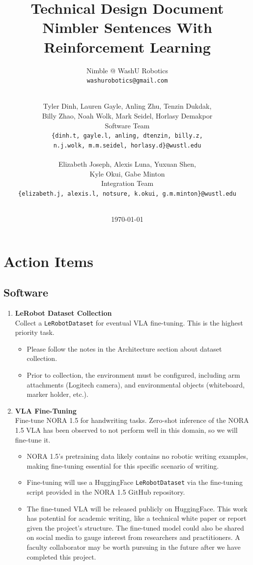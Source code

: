 \documentclass[12pt,a4paper]{article}
\title{\textbf{Technical Design Document}\\[0.5em]\large Nimbler Sentences With Reinforcement Learning}
\author{Nimble @ WashU Robotics \\ \texttt{washurobotics@gmail.com}}
\author{
    \\
    Tyler Dinh, Lauren Gayle, Anling Zhu, Tenzin Dukdak, \\
    Billy Zhao, Noah Wolk, Mark Seidel, Horlasy Demakpor \\[0.3em]
    Software Team \\[0.2em]
    \texttt{\{dinh.t, gayle.l, anling, dtenzin, billy.z,} \\
    \texttt{n.j.wolk, m.m.seidel, horlasy.d\}@wustl.edu} \\\\
    Elizabeth Joseph, Alexis Luna, Yuxuan Shen, \\
    Kyle Okui, Gabe Minton \\[0.3em]
    Integration Team \\[0.2em]
    \texttt{\{elizabeth.j, alexis.l, notsure, k.okui, g.m.minton\}@wustl.edu}\\\\
}
\date{\today}
\begin{document}
\maketitle
\newpage
\tableofcontents
\newpage

\section*{Action Items}
\subsection*{Software}

\begin{enumerate}

  \item \textbf{LeRobot Dataset Collection} \\
  Collect a \texttt{LeRobotDataset} for eventual VLA fine-tuning. This is the highest priority task.
  \begin{itemize}
    \item Please follow the notes in the Architecture section about dataset collection.
    \item Prior to collection, the environment must be configured, including arm attachments (Logitech camera), and environmental objects (whiteboard, marker holder, etc.).
  \end{itemize}

  \item \textbf{VLA Fine-Tuning} \\
  Fine-tune NORA 1.5 for handwriting tasks. Zero-shot inference of the NORA 1.5 VLA has been observed to not perform well in this domain, so we will fine-tune it.
  \begin{itemize}
    \item NORA 1.5's pretraining data likely contains no robotic writing examples, making fine-tuning essential for this specific scenario of writing.
    \item Fine-tuning will use a HuggingFace \texttt{LeRobotDataset} via the fine-tuning script provided in the NORA 1.5 GitHub repository.
    \item The fine-tuned VLA will be released publicly on HuggingFace. This work has potential for academic writing, like a technical white paper or report given the project's structure. The fine-tuned model could also be shared on social media to gauge interest from researchers and practitioners. A faculty collaborator may be worth pursuing in the future after we have completed this project.
  \end{itemize}

\end{enumerate}
\end{document}
